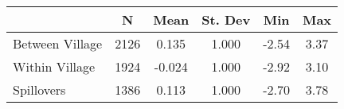 \begin{tabular}{l*{5}{c}}\hline&\multicolumn{1}{c}{N}&\multicolumn{1}{c}{Mean}&\multicolumn{1}{c}{St. Dev}&\multicolumn{1}{c}{Min}&\multicolumn{1}{c}{Max}\\ \hline 
Between Village & 2126 & 0.135 & 1.000 & -2.54 & 3.37 \\
Within Village & 1924 & -0.024 & 1.000 & -2.92 & 3.10 \\
Spillovers & 1386 & 0.113 & 1.000 & -2.70 & 3.78 \\
\hline \end{tabular}
